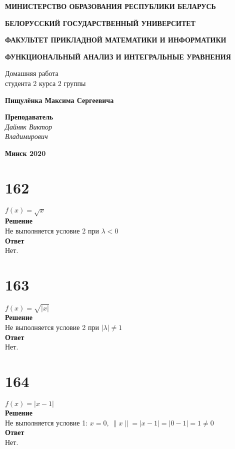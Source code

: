 \documentclass[a4paper]{article}
\begin{document}
\begin{titlepage}


  
  \centerline{\large \bf МИНИСТЕРСТВО ОБРАЗОВАНИЯ РЕСПУБЛИКИ БЕЛАРУСЬ}
  \bigskip
  \bigskip
  \centerline{\large \bf БЕЛОРУССКИЙ ГОСУДАРСТВЕННЫЙ УНИВЕРСИТЕТ}
  \bigskip
  \bigskip
  \centerline{\large \bf ФАКУЛЬТЕТ ПРИКЛАДНОЙ МАТЕМАТИКИ И ИНФОРМАТИКИ}
  \vfill
  \vfill
  \vfill
  \centerline{\Large \bf ФУНКЦИОНАЛЬНЫЙ АНАЛИЗ И ИНТЕГРАЛЬНЫЕ УРАВНЕНИЯ}
  \bigskip
  \bigskip
  \vfill
  \begin{centering}
    {\large
    Домашняя работа\\
    студента 2 курса 2 группы \\}
  \end{centering}
  \centerline{\large \bf Пищулёнка Максима Сергеевича}
  \vfill
  \vfill
  \hfill
  \begin{minipage}{0.25\textwidth}
    {\large{\bf Преподаватель} \\
  {\it Дайняк Виктор \\ Владимирович}}
  \end{minipage}
  \vfill
  \vfill
  \centerline{\Large \bf Минск 2020}
  
  \end{titlepage}

\begin{center}
\end{center}

\leavevmode\thispagestyle{empty}\newpage

\section*{162}
$f(x) = \sqrt{x}$\\
\textbf{Решение}\\
Не выполняется условие 2 при $\lambda < 0$\\
\textbf{Ответ}\\
Нет.
\section*{163}
$f(x)=\sqrt{|x|}$\\
\textbf{Решение}\\
Не выполняется условие 2 при $|\lambda| \neq 1$\\
\textbf{Ответ}\\Нет.

\section*{164}
$f(x) = |x-1|$\\
\textbf{Решение}\\
Не выполняется условие 1: $x = 0, \ \|x\| = |x - 1| = |0 - 1| = 1 \ne 0$\\
\textbf{Ответ}\\Нет.
\end{document}
